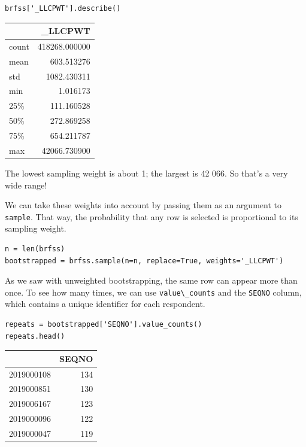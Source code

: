 \begin{lstlisting}[]
brfss['_LLCPWT'].describe()
\end{lstlisting}

\begin{tabular}{lr}
\midrule
{} &        \_LLCPWT \\
\midrule
count &  418268.000000 \\
mean  &     603.513276 \\
std   &    1082.430311 \\
min   &       1.016173 \\
25\%   &     111.160528 \\
50\%   &     272.869258 \\
75\%   &     654.211787 \\
max   &   42066.730900 \\
\midrule
\end{tabular}

The lowest sampling weight is about 1; the largest is 42 066. So that's
a very wide range!

We can take these weights into account by passing them as an argument to
\passthrough{\lstinline!sample!}. That way, the probability that any row
is selected is proportional to its sampling weight.

\begin{lstlisting}[]
n = len(brfss)
bootstrapped = brfss.sample(n=n, replace=True, weights='_LLCPWT')
\end{lstlisting}

As we saw with unweighted bootstrapping, the same row can appear more
than once. To see how many times, we can use
\passthrough{\lstinline!value\_counts!} and the
\passthrough{\lstinline!SEQNO!} column, which contains a unique
identifier for each respondent.

\begin{lstlisting}[]
repeats = bootstrapped['SEQNO'].value_counts()
repeats.head()
\end{lstlisting}

\begin{tabular}{lr}
\midrule
{} &  SEQNO \\
\midrule
2019000108 &    134 \\
2019000851 &    130 \\
2019006167 &    123 \\
2019000096 &    122 \\
2019000047 &    119 \\
\midrule
\end{tabular}

